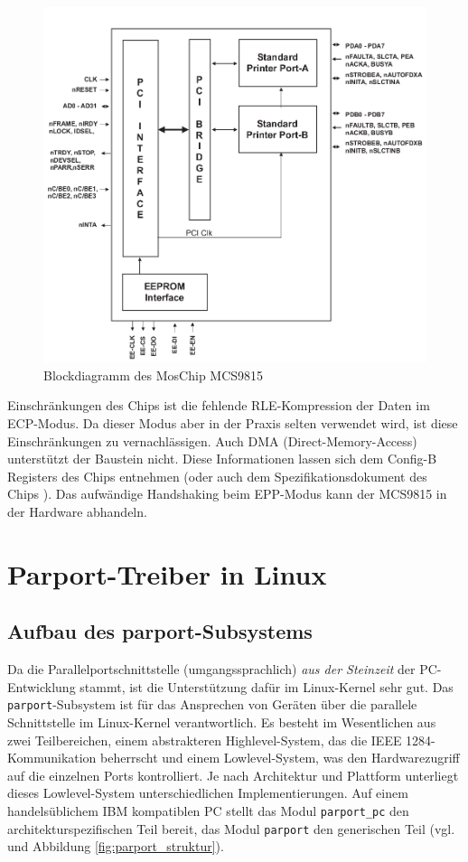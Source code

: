 \documentclass[a4paper,11pt]{article}
\begin{document}
\begin{figure}[h!]
 \centering
 \includegraphics[bb=0 0 724 671,scale=0.5]{./pics/mcs9815_block_diagram.png}
 \caption{Blockdiagramm des MosChip MCS9815}
 \label{fig:blockdiagramm_mcs9815}
\end{figure}
\noindent
Einschränkungen des Chips ist die fehlende RLE-Kompression der Daten im ECP-Modus. Da dieser Modus aber
in der Praxis selten verwendet wird, ist diese Einschränkungen zu vernachlässigen.
Auch DMA (Direct-Memory-Access) unterstützt der Baustein nicht. Diese Informationen lassen sich dem Config-B Registers des
Chips entnehmen (oder auch dem Spezifikationsdokument des Chips \cite{net:3}).
Das aufwändige Handshaking beim EPP-Modus kann der MCS9815 in der Hardware abhandeln.

\section{Parport-Treiber in Linux}

\subsection{Aufbau des parport-Subsystems}


Da die Parallelportschnittstelle (umgangssprachlich) \textit{aus der Steinzeit} der PC-Entwicklung stammt, ist die Unterstützung
dafür im Linux-Kernel sehr gut. Das \verb|parport|-Subsystem ist für das Ansprechen von Geräten über die parallele Schnittstelle im Linux-Kernel verantwortlich.
Es besteht im Wesentlichen aus zwei Teilbereichen, einem abstrakteren Highlevel-System, das
die IEEE 1284-Kommunikation beherrscht und einem Lowlevel-System, was den Hardwarezugriff auf die einzelnen Ports
kontrolliert. Je nach Architektur und Plattform unterliegt dieses Lowlevel-System unterschiedlichen Implementierungen. Auf einem handelsüblichem IBM kompatiblen PC stellt das Modul \verb|parport_pc| den architekturspezifischen Teil bereit, das Modul \verb|parport| den generischen Teil (vgl. \cite{net:1} und Abbildung \ref{fig:parport_struktur}). 
\end{document}
